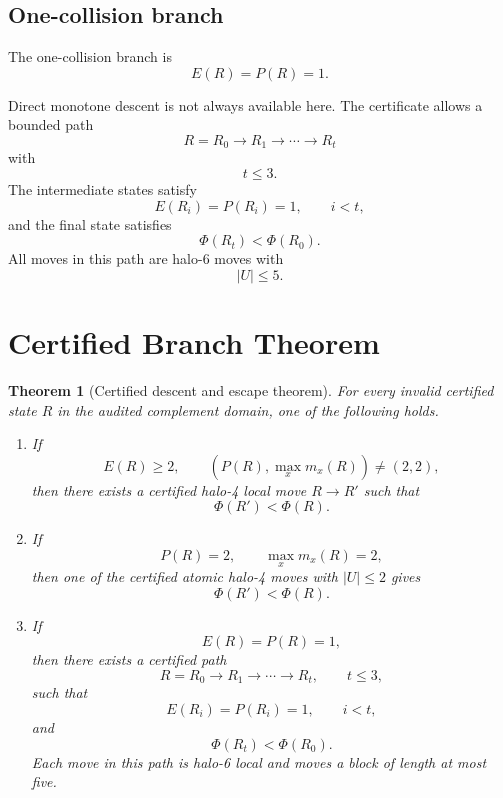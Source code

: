 \documentclass[11pt]{article}
\newtheorem{theorem}{Theorem}
\newcommand{\PhiPot}{\Phi}
\begin{document}
\subsection{One-collision branch}

The one-collision branch is
\[
E(R)=P(R)=1.
\]

Direct monotone descent is not always available here. The certificate allows a bounded path
\[
R=R_0\to R_1\to\cdots\to R_t
\]
with
\[
t\le3.
\]
The intermediate states satisfy
\[
E(R_i)=P(R_i)=1,\qquad i<t,
\]
and the final state satisfies
\[
\PhiPot(R_t)<\PhiPot(R_0).
\]
All moves in this path are halo-6 moves with
\[
|U|\le5.
\]

\section{Certified Branch Theorem}

\begin{theorem}[Certified descent and escape theorem]
For every invalid certified state \(R\) in the audited complement domain, one of the following holds.

\begin{enumerate}[label=(\roman*)]
\item If
\[
E(R)\ge2,\qquad (P(R),\max_xm_x(R))\ne(2,2),
\]
then there exists a certified halo-4 local move \(R\to R'\) such that
\[
\PhiPot(R')<\PhiPot(R).
\]

\item If
\[
P(R)=2,\qquad \max_xm_x(R)=2,
\]
then one of the certified atomic halo-4 moves with \(|U|\le2\) gives
\[
\PhiPot(R')<\PhiPot(R).
\]

\item If
\[
E(R)=P(R)=1,
\]
then there exists a certified path
\[
R=R_0\to R_1\to\cdots\to R_t,\qquad t\le3,
\]
such that
\[
E(R_i)=P(R_i)=1,\qquad i<t,
\]
and
\[
\PhiPot(R_t)<\PhiPot(R_0).
\]
Each move in this path is halo-6 local and moves a block of length at most five.
\end{enumerate}
\end{theorem}
\end{document}
